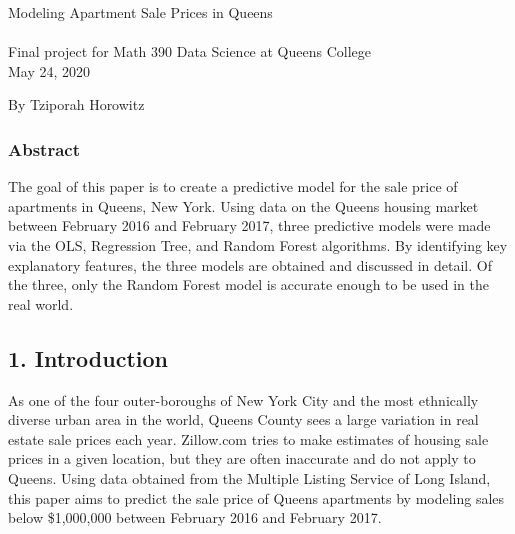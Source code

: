 \documentclass[12pt]{article}
\begin{document}
\begin{center}
Modeling Apartment Sale Prices in Queens\\~\\
\footnotesize Final project for Math 390 Data Science at Queens College\\
May 24, 2020
\end{center}

\begin{flushright}
By Tziporah Horowitz\\
\end{flushright}

\subsubsection*{Abstract}

The goal of this paper is to create a predictive model for the sale price of apartments in Queens, New York. Using data on the Queens housing market between February 2016 and February 2017, three predictive models were made via the OLS, Regression Tree, and Random Forest algorithms. By identifying key explanatory features, the three models are obtained and discussed in detail. Of the three, only the Random Forest model is accurate enough to be used in the real world.

\pagebreak



\subsection*{1. Introduction}


As one of the four outer-boroughs of New York City and the most ethnically diverse urban area in the world, Queens County sees a large variation in real estate sale prices each year. Zillow.com tries to make estimates of housing sale prices in a given location, but they are often inaccurate and do not apply to Queens. Using data obtained from the Multiple Listing Service of Long Island, this paper aims to predict the sale price of Queens apartments by modeling sales below \$1,000,000 between February 2016 and February 2017.
\end{document}
